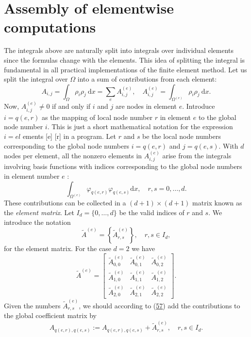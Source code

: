\documentclass[../main.tex]{subfiles}
\begin{document}
\section[Assembly of elementwise computations]{Assembly of elementwise computations}
\label{sec:sec_3_7}
The integrals above are naturally split into integrals over individual elements since the formulas change with the elements. This idea of splitting the integral is fundamental in all practical implementations of the finite element method.
Let us split the integral over $\Omega$ into a sum of contributions from each element:
\begin{equation}\label{eqa57}
	A_{i, j}=\int_{\Omega} \rho_{i} \rho_{j} \mathrm{~d} x=\sum_{e} A_{i, j}^{(e)}, \quad A_{i, j}^{(e)}=\int_{\Omega^{(e)}} \rho_{i} \rho_{j} \mathrm{~d} x.
\end{equation}
Now, $A_{i, j}^{(e)} \neq 0$ if and only if $i$ and $j$ are nodes in element $e$. Introduce $i=q(e, r)$ as the mapping of local node number $r$ in element $e$ to the global node number $i$. This is just a short mathematical notation for the expression $i=e l$ ements [e] [r] in a program. Let $r$ and $s$ be the local node numbers corresponding to the global node numbers $i=q(e, r)$ and $j=q(e, s)$. With $d$ nodes per element, all the nonzero elements in $A_{i, j}^{(e)}$ arise from the integrals involving basis functions with indices corresponding to the global node numbers in element number $e$ :
$$
\int_{\Omega^{(e)}} \varphi_{q(e, r)} \varphi_{q(e, s)} \mathrm{d} x, \quad r, s=0, \ldots, d .
$$
These contributions can be collected in a $(d+1) \times(d+1)$ matrix known as the \textit{element matrix}. Let $I_{d}=\{0, \ldots, d\}$ be the valid indices of $r$ and $s$. We introduce the notation
$$
\tilde{A}^{(e)}=\left\{\tilde{A}_{r, s}^{(e)}\right\}, \quad r, s \in I_{d},
$$
for the element matrix. For the case $d=2$ we have
$$
\tilde{A}^{(e)}=\left[\begin{array}{ccc}
	\tilde{A}_{0,0}^{(e)} & \tilde{A}_{0,1}^{(e)} & \tilde{A}_{0,2}^{(e)} \\
	\tilde{A}_{1,0}^{(e)} & \tilde{A}_{1,1}^{(e)} & \tilde{A}_{1,2}^{(e)} \\
	\tilde{A}_{2,0}^{(e)} & \tilde{A}_{2,1}^{(e)} & \tilde{A}_{2,2}^{(e)}
\end{array}\right] .
$$
Given the numbers $\tilde{A}_{r, s}^{(e)}$, we should according to (\hyperref[eqa57]{57}) add the contributions to the global coefficient matrix by
\begin{equation}\label{eqa58}
	A_{q(e, r), q(e, s)}:=A_{q(e, r), q(e, s)}+\tilde{A}_{r, s}^{(e)}, \quad r, s \in I_{d} .
\end{equation}
\end{document}
